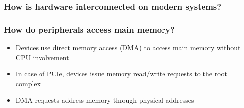 \begin{frame}
    \frametitle{How is hardware interconnected on modern systems?}


\end{frame}

\begin{frame}
    \frametitle{How do peripherals access main memory?}

    \begin{itemize}
        \item Devices use direct memory access (DMA) to access main memory without
            CPU involvement
        \item In case of PCIe, devices issue memory read/write requests to the
            root complex
        \item DMA requests address memory through physical addresses
    \end{itemize}
\end{frame}

